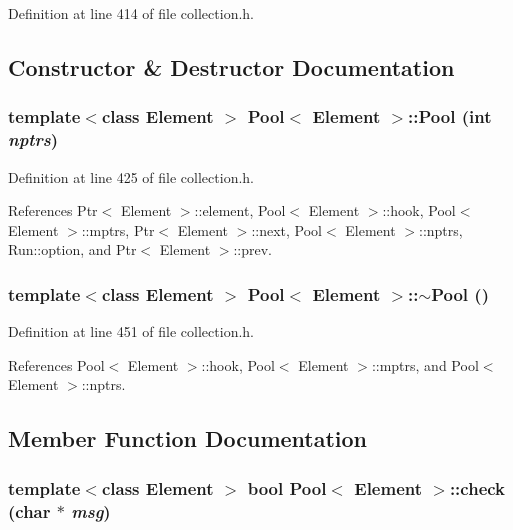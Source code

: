 Definition at line 414 of file collection.h.

\subsection{Constructor \& Destructor Documentation}
\hypertarget{structPool_cb28baa3e52a1256f3832f6888780580}{
\subsubsection[{Pool}]{\setlength{\rightskip}{0pt plus 5cm}template$<$class Element $>$ {\bf Pool}$<$ Element $>$::{\bf Pool} (int {\em nptrs})}}
\label{structPool_cb28baa3e52a1256f3832f6888780580}




Definition at line 425 of file collection.h.

References Ptr$<$ Element $>$::element, Pool$<$ Element $>$::hook, Pool$<$ Element $>$::mptrs, Ptr$<$ Element $>$::next, Pool$<$ Element $>$::nptrs, Run::option, and Ptr$<$ Element $>$::prev.\hypertarget{structPool_1c8a8beac7294a0076e6086c244b2f1c}{
\subsubsection[{$\sim$Pool}]{\setlength{\rightskip}{0pt plus 5cm}template$<$class Element $>$ {\bf Pool}$<$ Element $>$::$\sim${\bf Pool} ()}}
\label{structPool_1c8a8beac7294a0076e6086c244b2f1c}




Definition at line 451 of file collection.h.

References Pool$<$ Element $>$::hook, Pool$<$ Element $>$::mptrs, and Pool$<$ Element $>$::nptrs.

\subsection{Member Function Documentation}
\hypertarget{structPool_377972ba9ffbcf6574d611bc1d9be56b}{
\subsubsection[{check}]{\setlength{\rightskip}{0pt plus 5cm}template$<$class Element $>$ bool {\bf Pool}$<$ Element $>$::check (char $\ast$ {\em msg})}}
\label{structPool_377972ba9ffbcf6574d611bc1d9be56b}




